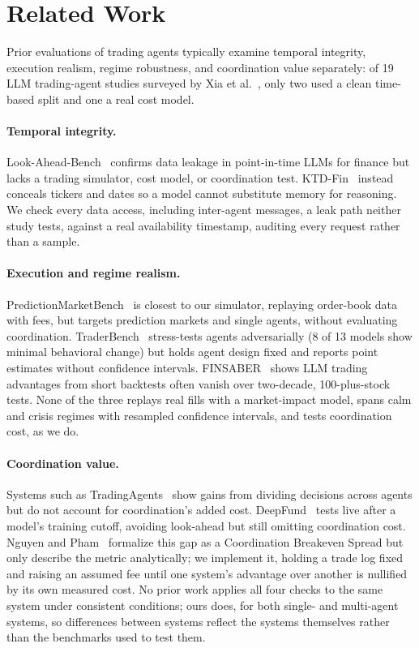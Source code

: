 \documentclass{article}
\begin{document}
\section{Related Work}
Prior evaluations of trading agents typically examine temporal integrity, execution realism, regime robustness, and coordination value separately: of 19 LLM trading-agent studies surveyed by Xia et al.~\cite{xia2025}, only two used a clean time-based split and one a real cost model.
\paragraph{Temporal integrity.} Look-Ahead-Bench~\cite{benhenda2026} confirms data leakage in point-in-time LLMs for finance but lacks a trading simulator, cost model, or coordination test. KTD-Fin~\cite{zhu2026ktdfin} instead conceals tickers and dates so a model cannot substitute memory for reasoning. We check every data access, including inter-agent messages, a leak path neither study tests, against a real availability timestamp, auditing every request rather than a sample.
\paragraph{Execution and regime realism.} PredictionMarketBench~\cite{arora2026} is closest to our simulator, replaying order-book data with fees, but targets prediction markets and single agents, without evaluating coordination. TraderBench~\cite{yuan2026traderbench} stress-tests agents adversarially (8 of 13 models show minimal behavioral change) but holds agent design fixed and reports point estimates without confidence intervals. FINSABER~\cite{li2025finsaber} shows LLM trading advantages from short backtests often vanish over two-decade, 100-plus-stock tests. None of the three replays real fills with a market-impact model, spans calm and crisis regimes with resampled confidence intervals, and tests coordination cost, as we do.
\paragraph{Coordination value.} Systems such as TradingAgents~\cite{xiao2024ta} show gains from dividing decisions across agents but do not account for coordination's added cost. DeepFund~\cite{li2025deepfund} tests live after a model's training cutoff, avoiding look-ahead but still omitting coordination cost. Nguyen and Pham~\cite{nguyen2026} formalize this gap as a Coordination Breakeven Spread but only describe the metric analytically; we implement it, holding a trade log fixed and raising an assumed fee until one system's advantage over another is nullified by its own measured cost.
No prior work applies all four checks to the same system under consistent conditions; ours does, for both single- and multi-agent systems, so differences between systems reflect the systems themselves rather than the benchmarks used to test them.
\end{document}
